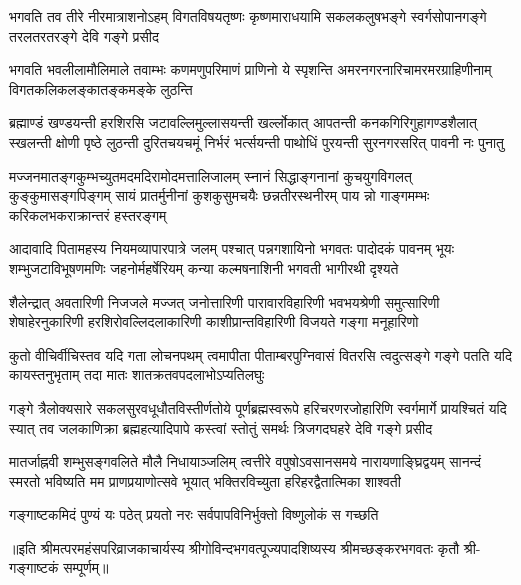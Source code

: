 

\fourlineindentedshloka
{भगवति तव तीरे नीरमात्राशनोऽहम्}
{विगतविषयतृष्णः कृष्णमाराधयामि}
{सकलकलुषभङ्गे स्वर्गसोपानगङ्गे}
{तरलतरतरङ्गे देवि गङ्गे प्रसीद}%

\fourlineindentedshloka
{भगवति भवलीलामौलिमाले तवाम्भः}
{कणमणुपरिमाणं प्राणिनो ये स्पृशन्ति}
{अमरनगरनारिचामरमरग्राहिणीनाम्}
{विगतकलिकलङ्कातङ्कमङ्के लुठन्ति}%

\fourlineindentedshloka
{ब्रह्माण्डं खण्डयन्ती हरशिरसि जटावल्लिमुल्लासयन्ती}
{खर्ल्लोकात् आपतन्ती कनकगिरिगुहागण्डशैलात् स्खलन्ती}
{क्षोणी पृष्ठे लुठन्ती दुरितचयचमूं निर्भरं भर्त्सयन्ती}
{पाथोधिं पुरयन्ती सुरनगरसरित् पावनी नः पुनातु}%

\fourlineindentedshloka
{मज्जनमातङ्गकुम्भच्युतमदमदिरामोदमत्तालिजालम्}
{स्नानं सिद्धाङ्गनानां कुचयुगविगलत् कुङ्कुमासङ्गपिङ्गम्}
{सायं प्रातर्मुनीनां कुशकुसुमचयैः छन्नतीरस्थनीरम्}
{पाय न्नो गाङ्गमम्भः करिकलभकराक्रान्तरं हस्तरङ्गम्}%

\fourlineindentedshloka
{आदावादि पितामहस्य नियमव्यापारपात्रे जलम्}
{पश्चात् पन्नगशायिनो भगवतः पादोदकं पावनम्}
{भूयः शम्भुजटाविभूषणमणिः जहनोर्महर्षेरियम्}
{कन्या कल्मषनाशिनी भगवती भागीरथी दृश्यते}%

\fourlineindentedshloka
{शैलेन्द्रात् अवतारिणी निजजले मज्जत् जनोत्तारिणी}
{पारावारविहारिणी भवभयश्रेणी समुत्सारिणी}
{शेषाहेरनुकारिणी हरशिरोवल्लिदलाकारिणी}
{काशीप्रान्तविहारिणी विजयते गङ्गा मनूहारिणो}%

\fourlineindentedshloka
{कुतो वीचिर्वीचिस्तव यदि गता लोचनपथम्}
{त्वमापीता पीताम्बरपुग्निवासं वितरसि}
{त्वदुत्सङ्गे गङ्गे पतति यदि कायस्तनुभृताम्}
{तदा मातः शातक्रतवपदलाभोऽप्यतिलघुः}%

\fourlineindentedshloka
{गङ्गे त्रैलोक्यसारे सकलसुरवधूधौतविस्तीर्णतोये}
{पूर्णब्रह्मस्वरूपे हरिचरणरजोहारिणि स्वर्गमार्गे}
{प्रायश्चितं यदि स्यात् तव जलकाणिक्रा ब्रह्महत्यादिपापे}
{कस्त्वां स्तोतुं समर्थः त्रिजगदघहरे देवि गङ्गे प्रसीद}%

\fourlineindentedshloka
{मातर्जाह्नवी शम्भुसङ्गवलिते मौलै निधायाञ्जलिम्}
{त्वत्तीरे वपुषोऽवसानसमये नारायणाङ्घ्रिद्वयम्}
{सानन्दं स्मरतो भविष्यति मम प्राणप्रयाणोत्सवे}
{भूयात् भक्तिरविच्युता हरिहरद्वैतात्मिका शाश्वती}%

\twolineshloka
{गङ्गाष्टकमिदं पुण्यं यः पठेत् प्रयतो नरः}
{सर्वपापविनिर्भुक्तो विष्णुलोकं स गच्छति}%


॥इति श्रीमत्परमहंसपरिव्राजकाचार्यस्य श्रीगोविन्दभगवत्पूज्यपादशिष्यस्य 
श्रीमच्छङ्करभगवतः कृतौ श्री-गङ्गाष्टकं सम्पूर्णम्॥